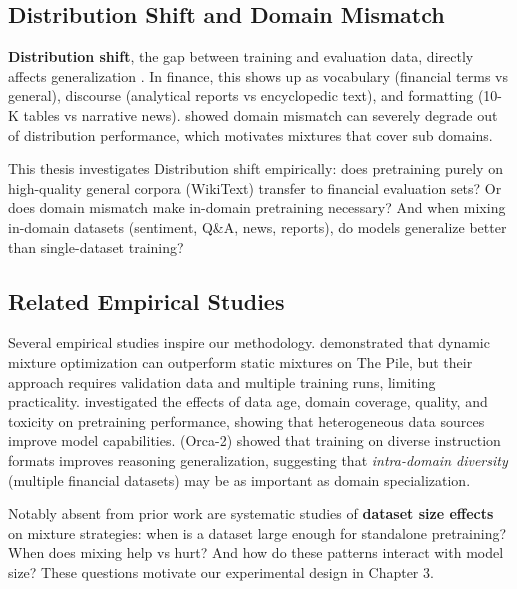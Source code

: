 \subsection{Distribution Shift and Domain Mismatch}

\textbf{Distribution shift}, the gap between training and evaluation data, directly affects generalization \parencite{quinonero2009dataset}. In finance, this shows up as vocabulary (financial terms vs general), discourse (analytical reports vs encyclopedic text), and formatting (10-K tables vs narrative news). \textcite{aharoni2020unsupervised} showed domain mismatch can severely degrade out of distribution performance, which motivates mixtures that cover sub domains.

This thesis investigates Distribution shift empirically: does pretraining purely on high-quality general corpora (WikiText) transfer to financial evaluation sets? Or does domain mismatch make in-domain pretraining necessary? And when mixing in-domain datasets (sentiment, Q\&A, news, reports), do models generalize better than single-dataset training?

\subsection{Related Empirical Studies}

Several empirical studies inspire our methodology. \textcite{xie2023doremi} demonstrated that dynamic mixture optimization can outperform static mixtures on The Pile, but their approach requires validation data and multiple training runs, limiting practicality. \textcite{longpre2023pretrainer} investigated the effects of data age, domain coverage, quality, and toxicity on pretraining performance, showing that heterogeneous data sources improve model capabilities. \textcite{mitra2023orca2} (Orca-2) showed that training on diverse instruction formats improves reasoning generalization, suggesting that \textit{intra-domain diversity} (multiple financial datasets) may be as important as domain specialization.

Notably absent from prior work are systematic studies of \textbf{dataset size effects} on mixture strategies: when is a dataset large enough for standalone pretraining? When does mixing help vs hurt? And how do these patterns interact with model size? These questions motivate our experimental design in Chapter 3.
